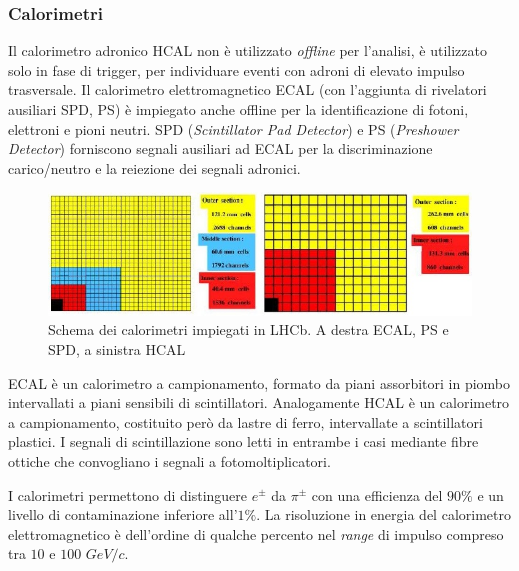 \subsubsection{Calorimetri}
\noindent
Il calorimetro adronico HCAL non \`e utilizzato \emph{offline} per l'analisi, \`e utilizzato solo in fase di trigger, per individuare eventi con adroni di elevato impulso trasversale.  
Il calorimetro elettromagnetico ECAL (con l'aggiunta di rivelatori ausiliari SPD, PS) \`e impiegato anche offline per la identificazione di fotoni, elettroni e pioni neutri.
SPD (\emph{Scintillator Pad Detector}) e PS (\emph{Preshower Detector}) forniscono segnali ausiliari ad ECAL per la discriminazione carico/neutro e la reiezione dei segnali adronici.
\begin{figure}[b]
\centering
\includegraphics[scale=0.65]{Immagini/ECAL}
\caption{Schema dei calorimetri impiegati in LHCb. A destra ECAL, PS e SPD, a sinistra HCAL}
\label{fig:ECAL}
\end{figure}
ECAL \`e un calorimetro a campionamento, formato da piani assorbitori in piombo intervallati a piani sensibili di scintillatori. Analogamente HCAL \`e un calorimetro a campionamento, costituito per\`o da lastre di ferro, intervallate a scintillatori plastici. I segnali di scintillazione sono letti in entrambe i casi mediante fibre ottiche che convogliano i segnali a fotomoltiplicatori.

I calorimetri permettono di distinguere $e^\pm$ da $\pi^\pm$ con una efficienza del $90\%$ e un livello di contaminazione inferiore all'$1\%$.
La risoluzione in energia del calorimetro elettromagnetico \`e dell'ordine di qualche percento nel \emph{range} di impulso compreso tra $10$ e $100$ $GeV/c$.

